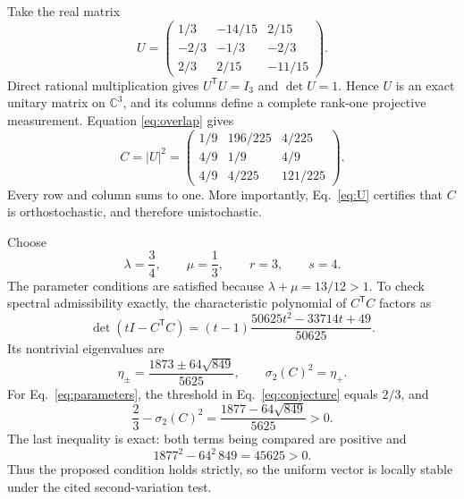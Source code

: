 \documentclass[aps,pra,reprint,superscriptaddress,nofootinbib,longbibliography]{revtex4-2}
\begin{document}
Take the real matrix
\begin{equation}
 U=\begin{pmatrix}
  1/3&-14/15&2/15\\
  -2/3&-1/3&-2/3\\
  2/3&2/15&-11/15
 \end{pmatrix}.
 \label{eq:U}
\end{equation}
Direct rational multiplication gives $U^{\mathsf T}U=I_3$ and
$\det U=1$.  Hence $U$ is an exact unitary matrix on $\mathbb C^3$, and its
columns define a complete rank-one projective measurement.  Equation
\eqref{eq:overlap} gives
\begin{equation}
 C=|U|^2=\begin{pmatrix}
  1/9&196/225&4/225\\
  4/9&1/9&4/9\\
  4/9&4/225&121/225
 \end{pmatrix}.
 \label{eq:C}
\end{equation}
Every row and column sums to one.  More importantly, Eq.~\eqref{eq:U}
certifies that $C$ is orthostochastic, and therefore unistochastic.

Choose
\begin{equation}
 \lambda=\frac34,\qquad \mu=\frac13,
 \qquad r=3,\qquad s=4.
 \label{eq:parameters}
\end{equation}
The parameter conditions are satisfied because
$\lambda+\mu=13/12>1$.  To check spectral admissibility exactly, the
characteristic polynomial of $C^{\mathsf T}C$ factors as
\begin{equation}
 \det(tI-C^{\mathsf T}C)
 =(t-1)\frac{50625t^2-33714t+49}{50625}.
 \label{eq:charpoly}
\end{equation}
Its nontrivial eigenvalues are
\begin{equation}
 \eta_{\pm}=\frac{1873\pm64\sqrt{849}}{5625},
 \qquad \sigma_2(C)^2=\eta_+.
 \label{eq:eigenvalues}
\end{equation}
For Eq.~\eqref{eq:parameters}, the threshold in
Eq.~\eqref{eq:conjecture} equals $2/3$, and
\begin{equation}
 \frac23-\sigma_2(C)^2
 =\frac{1877-64\sqrt{849}}{5625}>0.
 \label{eq:spectral-margin}
\end{equation}
The last inequality is exact: both terms being compared are positive and
\begin{equation}
 1877^2-64^2\,849=45625>0.
 \label{eq:spectral-certificate}
\end{equation}
Thus the proposed condition holds strictly, so the uniform vector is locally
stable under the cited second-variation test.
\end{document}
